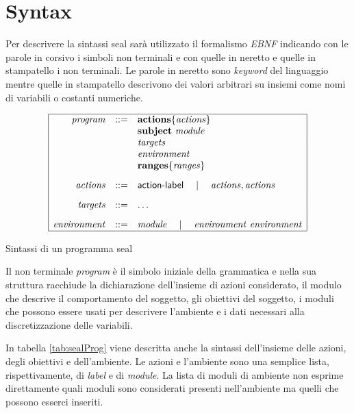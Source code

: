 \section{Syntax}
Per descrivere la sintassi \ac{seal} sarà utilizzato il formalismo \emph{EBNF} indicando con le parole in corsivo i simboli non terminali e con quelle in neretto e quelle in stampatello i non terminali. Le parole in neretto sono \emph{keyword} del linguaggio mentre quelle in stampatello descrivono dei valori arbitrari su insiemi come nomi di variabili o costanti numeriche.

\begin{table} %
$$
\begin{array}{|rcl|}
\hline
\mathit{program} &::=& \mathbf{actions} \{ \mathit{actions} \} \\
	&& \mathbf{subject} \mbox{ } \mathit{module} \\
	&& \mathit{targets} \\
	&& \mathit{environment} \\
	&& \mathbf{ranges} \{ \mathit{ranges} \}
	\\[.3cm]
\mathit{actions} &::=& {\sf action}\textrm{-}{\sf label} \quad\mid\quad \mathit{actions} , \mathit{actions}
	\\[.3cm]
\mathit{targets} &::=& \dots
	\\[.3cm]	
\mathit{environment} &::=& \mathit{module} \quad\mid\quad \mathit{environment} \mbox{ } \mathit{environment} 
	\\
\hline
\end{array}
$$
\label{tab:sealProg} %
\caption{Sintassi di un programma \ac{seal}}
\end{table}

Il non terminale \emph{program} è il simbolo iniziale della grammatica e nella sua struttura racchiude la dichiarazione dell'insieme di azioni considerato, il modulo che descrive il comportamento del soggetto, gli obiettivi del soggetto, i moduli che possono essere usati per descrivere l'ambiente e i dati necessari alla discretizzazione delle variabili.

In tabella \ref{tab:sealProg} viene descritta anche la sintassi dell'insieme delle azioni, degli obiettivi e dell'ambiente. Le azioni e l'ambiente sono una semplice lista, rispettivamente, di \emph{label} e di \emph{module}. La lista di moduli di ambiente non esprime direttamente quali moduli sono considerati presenti nell'ambiente ma quelli che possono esserci inseriti.

